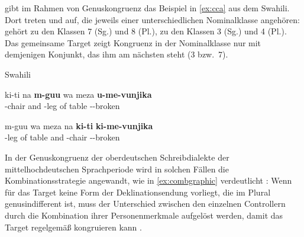 \citet[169]{corbett2006} gibt im Rahmen von Genuskongruenz das Beispiel in
\cref{ex:cca} aus dem Swahili. Dort treten   und   auf, die jeweils einer unterschiedlichen
Nominalklasse angehören:   gehört zu den Klassen 7 (Sg.)
und 8 (Pl.),   zu den Klassen 3 (Sg.) und 4 (Pl.). Das
gemeinsame Target  zeigt Kongruenz in der Nominalklasse
nur mit demjenigen Konjunkt, das ihm am nächsten steht (3 bzw.~7).

\begin{exe}
\ex \label{ex:cca}
	Swahili \autocites(zitiert in \cite[169]{corbett2006})[nach][45]{bokamba1985}
	\begin{xlist}
	\ex \label{ex:cca_1}
		\gll ki-ti na \textbf{m-guu} wa meza \textbf{u-me-vunjika} \\
			-chair and -leg of table
			-\Prf-broken \\
		\trans {}

	\ex \label{ex:cca_2}
		\gll m-guu wa meza na \textbf{ki-ti} \textbf{ki-me-vunjika} \\
			-leg of table and -chair
			-\Prf-broken \\
		\trans {}
	\end{xlist}
\end{exe}

In der Genuskongruenz der oberdeutschen Schreibdialekte der mittelhochdeutschen
Sprachperiode wird in solchen Fällen die Kombinationsstrategie angewandt, wie
in \cref{ex:combgraphic} verdeutlicht
\autocites[vgl.][312]{grimm1890}[329]{grimm1898}[39--41]{behaghel1928}[187--189]{dal2014}:
Wenn für das Target keine Form der Deklinationsendung vorliegt, die im Plural
genusindifferent ist, muss der Unterschied zwischen den einzelnen Controllern
durch die Kombination ihrer Personenmerkmale aufgelöst werden, damit das Target
regelgemäß kongruieren kann
\autocites[vgl.][182--193]{corbett1983}[269--306]{corbett1991}[243--263]{corbett2006}.

